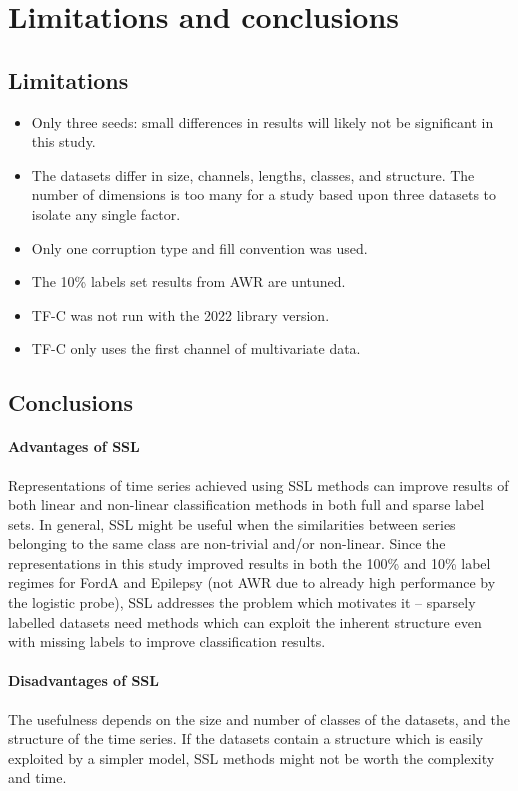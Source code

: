 \documentclass[a4paper,11pt]{article}
\begin{document}
\section{Limitations and conclusions}
\subsection{Limitations}
\begin{itemize}
\item Only three seeds: small differences in results will likely not be significant in this study.
\item The datasets differ in size, channels, lengths, classes, and structure. The number of dimensions is too many for a study based upon three datasets to isolate any single factor.
\item Only one corruption type and fill convention was used.
\item The 10\% labels set results from AWR are untuned.
\item TF-C was not run with the 2022 library version.
\item TF-C only uses the first channel of multivariate data.
\end{itemize}

\subsection{Conclusions}
\paragraph{Advantages of SSL}
Representations of time series achieved using SSL methods can improve results of both linear and non-linear classification methods in both full and sparse label sets. In general, SSL might be useful when the similarities between series belonging to the same class are non-trivial and/or non-linear. Since the representations in this study improved results in both the 100\% and 10\% label regimes for FordA and Epilepsy (not AWR due to already high performance by the logistic probe), SSL addresses the problem which motivates it -- sparsely labelled datasets need methods which can exploit the inherent structure even with missing labels to improve classification results.

\paragraph{Disadvantages of SSL}
The usefulness depends on the size and number of classes of the datasets, and the structure of the time series. If the datasets contain a structure which is easily exploited by a simpler model, SSL methods might not be worth the complexity and time.
\end{document}
